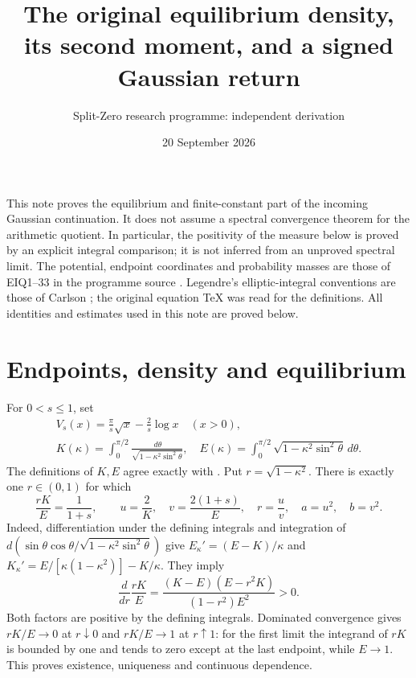 \documentclass[11pt]{article}
\title{The original equilibrium density, its second moment, and a signed Gaussian return}
\author{Split-Zero research programme: independent derivation}
\date{20 September 2026}
\newcommand{\dd}{\,d}\newcommand{\R}{\mathbb R}
\begin{document}
\maketitle
This note proves the equilibrium and finite-constant part of the incoming
Gaussian continuation. It does not assume a spectral convergence theorem
for the arithmetic quotient. In particular, the positivity of the measure
below is proved by an explicit integral comparison; it is not inferred
from an unproved spectral limit. The potential, endpoint coordinates and
probability masses are those of EIQ1--33 in the programme source
\cite{EIQ}. Legendre's elliptic-integral conventions are those of Carlson
\cite{Carlson}; the original equation TeX was read for the definitions.
All identities and estimates used in this note are proved below.

\section{Endpoints, density and equilibrium}
For $0<s\le1$, set
\begin{equation}\tag{GM1}
 \begin{gathered}
 V_s(x)=\frac\pi s\sqrt x-\frac2s\log x\quad(x>0),\qquad
 \\
 K(\kappa)=\int_0^{\pi/2}\frac{\dd\theta}{\sqrt{1-\kappa^2\sin^2\theta}},
 \quad E(\kappa)=\int_0^{\pi/2}\sqrt{1-\kappa^2\sin^2\theta}\dd\theta.
 \end{gathered}
\end{equation}
The definitions of $K,E$ agree exactly with \cite[19.2.4, 19.2.5,
19.2.8(a,b)]{Carlson}. Put $r=\sqrt{1-\kappa^2}$. There is exactly one
$r\in(0,1)$ for which
\begin{equation}\tag{GM2}
 \frac{rK}{E}=\frac1{1+s},\qquad
 u=\frac2K,\quad v=\frac{2(1+s)}E,\quad r=\frac uv,
 \quad a=u^2,\quad b=v^2.
\end{equation}
Indeed, differentiation under the defining integrals and integration of
$d(\sin\theta\cos\theta/\sqrt{1-\kappa^2\sin^2\theta})$ give
$E_\kappa'=(E-K)/\kappa$ and
$K_\kappa'=E/[\kappa(1-\kappa^2)]-K/\kappa$.
They imply
\begin{equation}\tag{GM3}
 \frac{d}{dr}\frac{rK}E
 =\frac{(K-E)(E-r^2K)}{(1-r^2)E^2}>0.
\end{equation}
Both factors are positive by the defining integrals. Dominated convergence
gives $rK/E\to0$ at $r\downarrow0$ and $rK/E\to1$ at $r\uparrow1$:
for the first limit the integrand of $rK$ is bounded by one and tends
to zero except at the last endpoint, while $E\to1$.
This proves existence, uniqueness and continuous dependence.
\end{document}
